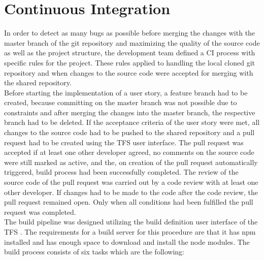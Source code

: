 \documentclass[Bachelor,BIF,english]{twbook}
\begin{document}
\section{Continuous Integration}
In order to detect as many bugs as possible before merging the changes with the master branch of the git \cite{Git} repository and maximizing the quality of the source code as well as the project structure, the development team defined a CI process with specific rules for the project. These rules applied to handling the local cloned git repository and when changes to the source code were accepted for merging with the shared repository. 
\\[\baselineskip]
Before starting the implementation of a user story, a feature branch had to be created, because committing on the master branch was not possible due to constraints and after merging the changes into the master branch, the respective branch had to be deleted. If the acceptance criteria of the user story were met, all changes to the source code had to be pushed to the shared repository and a pull request had to be created using the TFS user interface. The pull request was accepted if at least one other developer agreed, no comments on the source code were still marked as active, and the, on creation of the pull request automatically triggered, build process had been successfully completed. The review of the source code of the pull request was carried out by a code review with at least one other developer. If changes had to be made to the code after the code review, the pull request remained open. Only when all conditions had been fulfilled the pull request was completed.
\\[\baselineskip]
The build pipeline was designed utilizing the build definition user interface of the TFS \cite{TFSBuildPipeline} . The requirements for a build server for this procedure are that it has npm installed and has enough space to download and install the node modules. The build process consists of six tasks which are the following:
\end{document}
